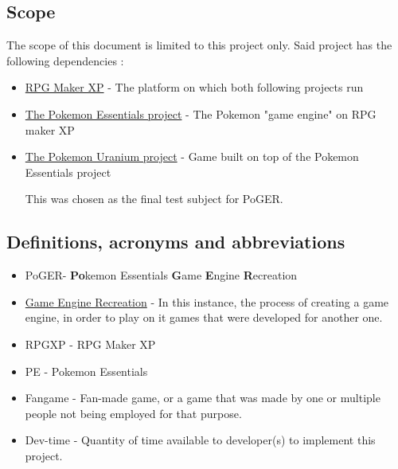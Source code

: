 \documentclass[11pt]{article}
\begin{document}
\subsection{Scope}

The scope of this document is limited to this project only. Said project has the following dependencies :
\begin{itemize}
	\item \href{https://www.rpgmakerweb.com/products/programs/rpg-maker-xp}{RPG Maker XP} - The platform on which both following projects run
	
	\item \href{https://essentialsdocs.fandom.com/wiki/Essentials\_Docs\_Wiki}{The Pokemon Essentials project} - The Pokemon "game engine" on RPG maker XP
	
	\item \href{https://pokemon-uranium.fandom.com/wiki/Main\_Page}{The Pokemon Uranium project} - Game built on top of the Pokemon Essentials project
	
	This was chosen as the final test subject for PoGER.
\end{itemize}


\subsection{Definitions, acronyms and abbreviations}

\begin{itemize}
	\item PoGER\footnotemark[\value{footnote}] - \textbf{Po}kemon Essentials \textbf{G}ame \textbf{E}ngine \textbf{R}ecreation
	
	\item \href{https://en.wikipedia.org/wiki/Game_engine_recreation}{Game Engine Recreation} - In this instance, the process of creating a game engine, in order to play on it games that were developed for another one.
	
	\item RPGXP - RPG Maker XP 
	
	\item PE - Pokemon Essentials
	
	\item Fangame - Fan-made game, or a game that was made by one or multiple people not being employed for that purpose.
	
	\item Dev-time - Quantity of time available to developer(s) to implement this project.
\end{itemize}
\end{document}
